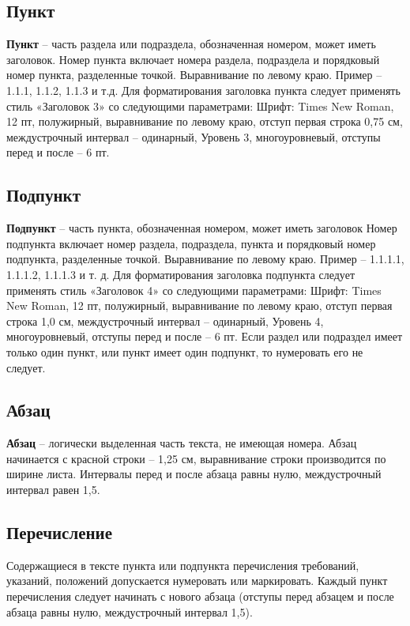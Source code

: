 \subsection{Пункт}

{\bf Пункт} -- часть раздела или подраздела, обозначенная номером, может иметь заголовок.
Номер пункта включает номера раздела, подраздела и порядковый номер пункта, разделенные
точкой. Выравнивание по левому краю. Пример – 1.1.1, 1.1.2, 1.1.3 и т.д.
Для форматирования заголовка пункта следует применять стиль «Заголовок 3» со
следующими параметрами: Шрифт: Times New Roman, 12 пт, полужирный, выравнивание по
левому краю, отступ первая строка 0,75 см, междустрочный интервал – одинарный, Уровень 3,
многоуровневый, отступы перед и после – 6 пт.

\subsection{Подпункт}

{\bf Подпункт} -- часть пункта, обозначенная номером, может иметь заголовок Номер
подпункта включает номер раздела, подраздела, пункта и порядковый номер подпункта,
разделенные точкой. Выравнивание по левому краю. Пример – 1.1.1.1, 1.1.1.2, 1.1.1.3 и т. д.
Для форматирования заголовка подпункта следует применять стиль «Заголовок 4» со
следующими параметрами: Шрифт: Times New Roman, 12 пт, полужирный, выравнивание по
левому краю, отступ первая строка 1,0 см, междустрочный интервал – одинарный, Уровень 4,
многоуровневый, отступы перед и после – 6 пт.
Если раздел или подраздел имеет только один пункт, или пункт имеет один подпункт, то
нумеровать его не следует.

\subsection{Абзац}

{\bf Абзац} -- логически выделенная часть текста, не имеющая номера. Абзац начинается с
красной строки – 1,25 см, выравнивание строки производится по ширине листа. Интервалы
перед и после абзаца равны нулю, междустрочный интервал равен 1,5.

\subsection{Перечисление}

Содержащиеся в тексте пункта или подпункта перечисления требований, указаний,
положений допускается нумеровать или маркировать. Каждый пункт перечисления следует
начинать с нового абзаца (отступы перед абзацем и после абзаца равны нулю, междустрочный
интервал 1,5).

